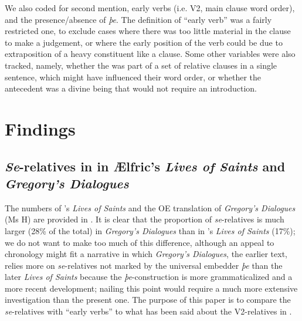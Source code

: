 \documentclass[output=paper,colorlinks,citecolor=brown]{langscibook}
\begin{document}
We also coded for second mention, early verbs (i.e. V2, main clause word order), and the presence/absence of \textit{þe}. The definition of “early verb” was a fairly restricted one, to exclude cases where there was too little material in the clause to make a judgement, or where the early position of the verb could be due to extraposition of a heavy constituent like a clause. Some other variables were also tracked, namely, whether the  was part of a set of relative clauses in a single sentence, which might have influenced their word order, or whether the antecedent was a divine being that would not require an introduction. 


\section{Findings} \label{sec:los:5}
\subsection{\textit{Se}-relatives in in Ælfric's \textit{Lives of Saints} and \textit{Gregory's Dialogues}}\label{sec:los:5.1}

The numbers of 's \textit{Lives of Saints} and the OE translation of \textit{Gregory's Dialogues} (Ms H) are provided in . It is clear that the proportion of \textit{se}{}-relatives is much larger (28\% of the total) in \textit{Gregory's Dialogues} than in 's \textit{Lives of Saints} (17\%); we do not want to make too much of this difference, although an appeal to chronology might fit a narrative in which \textit{Gregory's Dialogues}, the earlier text, relies more on \textit{se}{}-relatives not marked by the universal embedder \textit{þe} than the later \textit{Lives of Saints} because the \textit{þe}{}-construction is more grammaticalized and a more recent development; nailing this point would require a much more extensive investigation than the present one. The purpose of this paper is to compare the \textit{se}{}-relatives with “early verbs” to what has been said about the V2-relatives in . 
\end{document}

